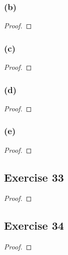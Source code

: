 \documentclass[14pt]{extarticle}
\begin{document}
\subsubsection{(b)}

\begin{proof}

\end{proof}

\subsubsection{(c)}

\begin{proof}

\end{proof}

\subsubsection{(d)}

\begin{proof}

\end{proof}

\subsubsection{(e)}

\begin{proof}

\end{proof}

\subsection{Exercise 33}

\begin{proof}

\end{proof}

\subsection{Exercise 34}

\begin{proof}

\end{proof}
\end{document}
